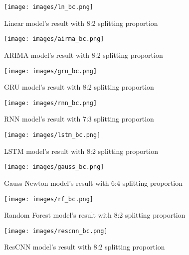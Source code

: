 \documentclass{ieeeojies}
\begin{document}
\begin{figure}[H]
  \centering
  \begin{minipage}{0.8\linewidth}
    \centering
    \texttt{[image: images/ln\_bc.png]}
    \caption{Linear model's result with 8:2 splitting proportion}
    \label{fig8}
  \end{minipage}
\end{figure}
\begin{figure}[H]
  \centering
  \begin{minipage}{0.8\linewidth}
    \centering
    \texttt{[image: images/airma\_bc.png]}
    \caption{ARIMA model's result with 8:2 splitting proportion}
    \label{fig9}
  \end{minipage}
\end{figure}
\begin{figure}[H]
  \centering
  \begin{minipage}{0.8\linewidth}
    \centering
    \texttt{[image: images/gru\_bc.png]}
    \caption{GRU model's result with 8:2 splitting proportion}
    \label{fig10}
  \end{minipage}
\end{figure}
\begin{figure}[H]
  \centering
  \begin{minipage}{0.8\linewidth}
    \centering
    \texttt{[image: images/rnn\_bc.png]}
    \caption{RNN model's result with 7:3 splitting proportion}
    \label{fig11}
  \end{minipage}
\end{figure}
\begin{figure}[H]
  \centering
  \begin{minipage}{0.8\linewidth}
    \centering
    \texttt{[image: images/lstm\_bc.png]}
    \caption{LSTM model's result with 8:2 splitting proportion}
    \label{fig12}
  \end{minipage}
\end{figure}
\begin{figure}[H]
  \centering
  \begin{minipage}{0.8\linewidth}
    \centering
    \texttt{[image: images/gauss\_bc.png]}
    \caption{Gauss Newton model's result with 6:4 splitting proportion}
    \label{fig13}
  \end{minipage}
\end{figure}
\begin{figure}[H]
  \centering
  \begin{minipage}{0.8\linewidth}
    \centering
    \texttt{[image: images/rf\_bc.png]}
    \caption{Random Forest model's result with 8:2 splitting proportion}
    \label{fig14}
  \end{minipage}
\end{figure}
\begin{figure}[H]
  \centering
  \begin{minipage}{0.8\linewidth}
    \centering
    \texttt{[image: images/rescnn\_bc.png]}
    \caption{ResCNN model's result with 8:2 splitting proportion}
    \label{bagginggru}
  \end{minipage}
\end{figure}
\end{document}
